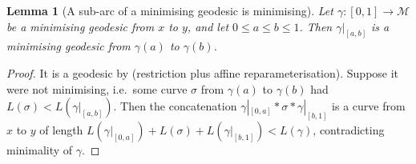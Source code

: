 \documentclass[11pt,a4paper]{report}
\newtheorem{lemma}[lemma]{Lemma}
\theoremstyle{definition}
\theoremstyle{remark}
\begin{document}
\begin{lemma}[A sub-arc of a minimising geodesic is minimising]
\label{lem:subarc-minimising}
Let $\gamma:[0,1]\to\mathcal M$ be a minimising geodesic from $x$ to $y$,
and let $0\le a\le b\le1$. Then $\gamma|_{[a,b]}$ is a minimising geodesic
from $\gamma(a)$ to $\gamma(b)$.
\end{lemma}

\begin{proof}
It is a geodesic by  (restriction plus affine
reparameterisation). Suppose it were not minimising, i.e.\ some curve
$\sigma$ from $\gamma(a)$ to $\gamma(b)$ had $L(\sigma)<L(\gamma|_{[a,b]})$.
Then the concatenation $\gamma|_{[0,a]}\ast\sigma\ast\gamma|_{[b,1]}$ is a
curve from $x$ to $y$ of length
$L(\gamma|_{[0,a]})+L(\sigma)+L(\gamma|_{[b,1]})<L(\gamma)$, contradicting
minimality of $\gamma$.
\end{proof}
\end{document}

